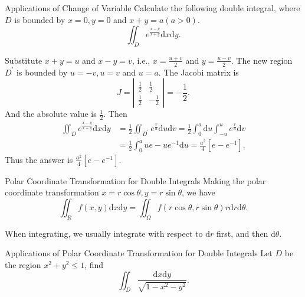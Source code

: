 \begin{example}{Applications of Change of Variable}{}
  Calculate the following double integral, where $D$ is bounded by $x = 0, y =
  0$ and $x+y = a (a > 0)$.
  \begin{equation}
    \iint_D e^{\frac{x-y}{x+y}}\mathrm{d} x \mathrm{d} y.
  \end{equation}
\end{example}

\begin{solution}
  Substitute $x+y = u$ and $x-y = v$, i.e., $x = \frac{u+v}{2}$ and $y = \frac{u-v}{2}$.
  The new region $D^{\prime}$ is bounded by $u = -v, u = v$ and $u = a$.
  The Jacobi matrix is 
  \begin{equation}
    J = \left|
      \begin{array}{cc}
        \frac{1}{2}&\frac{1}{2}\\
        \frac{1}{2}&-\frac{1}{2}
      \end{array}
    \right| = - \frac{1}{2}.
  \end{equation}
  And the absolute value is $\frac{1}{2}$.
  Then
  \begin{align}
    \iint_D e^{\frac{x-y}{x+y}}\mathrm{d} x \mathrm{d} y
    &= \frac{1}{2}\iint_{D^{\prime}} e^{\frac{v}{u}}\mathrm{d}u\mathrm{d}v
    = \frac{1}{2} \int_0^a \mathrm{d} u \int_{-u}^u e^{\frac{v}{u}}\mathrm{d} v\\
    &= \frac{1}{2} \int_0^a ue - ue^{-1}\mathrm{d} u
    = \frac{a^2}{4}[e - e^{-1}].
  \end{align}
  Thus the answer is $\frac{a^2}{4} [e - e^{-1}]$.
\end{solution}

\begin{proposition}{Polar Coordinate Transformation for Double Integrals}{}
  Making the polar coordinate transformation $x = r\cos\theta, y = r \sin
  \theta$,
  we have
  \begin{equation}
    \iint_R f(x, y)\mathrm{d} x \mathrm{d} y = \iint_{\Omega}f(r \cos \theta, r \sin \theta) r \mathrm{d} r \mathrm{d} \theta.
  \end{equation}
\end{proposition}

\begin{note}
  When integrating, we usually integrate with respect to $\mathrm{d} r$ first,
  and then $\mathrm{d} \theta$.
\end{note}

\begin{example}{Applications of Polar Coordinate Transformation for Double Integrals}{}
  Let $D$ be the region $x^2 + y^2 \leq 1$, find
  \begin{equation}
    \iint_D \frac{\mathrm{d} x\mathrm{d}y}{\sqrt{1 - x^2 - y^2}}.
  \end{equation}
\end{example}

